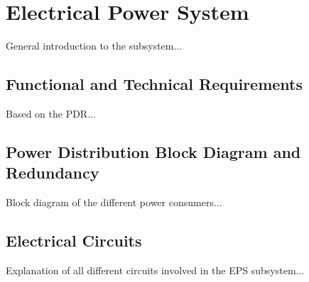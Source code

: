 \chapter{Electrical Power System}
\label{chap:eps}

General introduction to the subsystem...

\section{Functional and Technical Requirements}

Based on the PDR...

\section{Power Distribution Block Diagram and Redundancy}

Block diagram of the different power consumers...

\section{Electrical Circuits}

Explanation of all different circuits involved in the EPS subsystem...